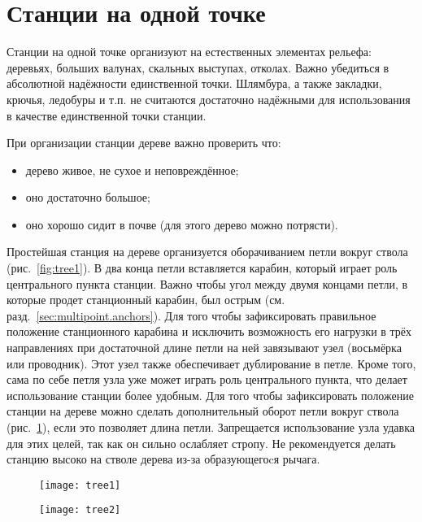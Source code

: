 \documentclass[fleqn, 12pt]{extarticle}
\begin{document}
\section{Станции на одной точке}
    Станции на одной точке организуют на естественных элементах рельефа: деревьях, больших валунах, скальных выступах, отколах. Важно убедиться в абсолютной надёжности единственной точки. 
    Шлямбура, а также закладки, крючья, ледобуры и т.п. не считаются достаточно надёжными для использования в качестве единственной точки станции.

   	При организации станции дереве важно проверить что:
    \begin{itemize}
        \item дерево живое, не сухое и неповреждённое;
        \item оно достаточно большое;
        \item оно хорошо сидит в почве (для этого дерево можно потрясти).
    \end{itemize}
    
	Простейшая станция на дереве организуется оборачиванием петли вокруг ствола (рис.~\ref{fig:tree1}). В два конца петли вставляется карабин, который играет роль центрального пункта станции.
    Важно чтобы угол между двумя концами петли, в которые продет станционный карабин, был острым
    (см. разд.~\ref{sec:multipoint.anchors}). Для того чтобы зафиксировать правильное положение станционного карабина и исключить возможность его нагрузки в трёх направлениях 
    при достаточной длине петли на ней завязывают узел (восьмёрка или проводник). Этот узел также обеспечивает дублирование в петле. Кроме того, сама по себе  петля узла уже может играть 
	роль центрального пункта, что делает использование станции более удобным. Для того чтобы зафиксировать положение станции на дереве можно сделать дополнительный оборот петли
    вокруг ствола (рис.~\ref{fig:tree2}),
	если это позволяет длина петли. Запрещается использование узла удавка для этих целей, так как он сильно ослабляет стропу.
    Не рекомендуется делать станцию высоко на стволе дерева из-за образующегоcя рычага.
    \begin{figure}
        \centering
        \begin{minipage}[t]{0.45\textwidth}
            \texttt{[image: tree1]}
            \label{fig:tree1}
        \end{minipage}\hspace{0.05\textwidth}
        \begin{minipage}[t]{0.45\textwidth}
            \texttt{[image: tree2]}
            \label{fig:tree2}
        \end{minipage}
    \end{figure}
\end{document}
